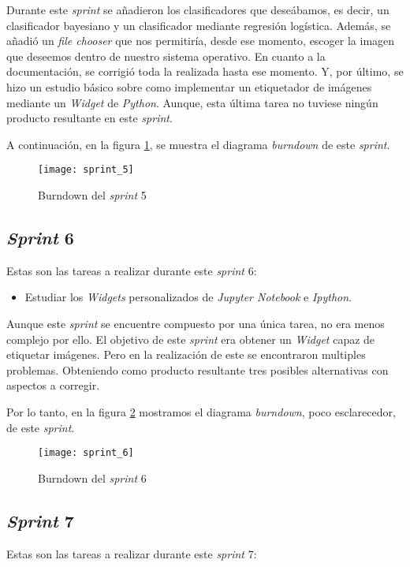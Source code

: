 Durante este \textit{sprint} se añadieron los clasificadores que deseábamos, es decir, un clasificador bayesiano y un clasificador mediante regresión logística. Además, se añadió un \textit{file chooser} que nos permitiría, desde ese momento, escoger la imagen que deseemos dentro de nuestro sistema operativo. En cuanto a la documentación, se corrigió toda la  realizada hasta ese momento. Y, por último, se hizo un estudio básico sobre como implementar un etiquetador de imágenes mediante un \textit{Widget} de \textit{Python}. Aunque, esta última tarea no tuviese ningún producto resultante en este \textit{sprint}.

A continuación, en la figura \ref{fig:A.1.6}, se muestra el diagrama \textit{burndown} de este \textit{sprint}.

\begin{figure}
\centering
\texttt{[image: sprint\_5]}
\caption{Burndown del \textit{sprint} 5}
\label{fig:A.1.6}
\end{figure}

\subsection{\textit{Sprint} 6}
Estas son las tareas a realizar durante este \textit{sprint} 6:

\begin{itemize}
	\item Estudiar los \textit{Widgets} personalizados de \textit{Jupyter Notebook} e \textit{Ipython}.
\end{itemize}

Aunque este \textit{sprint} se encuentre compuesto por una única tarea, no era menos complejo por ello. El objetivo de este \textit{sprint} era obtener un \textit{Widget} capaz de etiquetar imágenes. Pero en la realización de este se encontraron multiples problemas. Obteniendo como producto resultante tres posibles alternativas con aspectos a corregir.

Por lo tanto, en la figura \ref{fig:A.1.7} mostramos el diagrama \textit{burndown}, poco esclarecedor, de este \textit{sprint}.

\begin{figure}
\centering
\texttt{[image: sprint\_6]}
\caption{Burndown del \textit{sprint} 6}
\label{fig:A.1.7}
\end{figure}



\subsection{\textit{Sprint} 7}
Estas son las tareas a realizar durante este \textit{sprint} 7:

